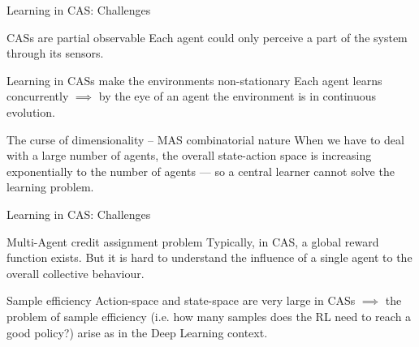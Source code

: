 \documentclass[presentation]{beamer}\mode<presentation>{\usetheme{AMSBolognaFC}}
\begin{document}
\begin{frame}[c]{Learning in CAS: Challenges}
	\begin{exampleblock}{CASs are partial observable}
		Each agent could only perceive a part of the system through its sensors.
	\end{exampleblock}
	\begin{alertblock}{Learning in CASs make the environments non-stationary}
		Each agent learns concurrently $\implies$ by the eye of an agent the environment is in continuous evolution.
	\end{alertblock}
	\begin{alertblock}{The curse of dimensionality -- MAS combinatorial nature}
		When we have to deal with a large number of agents, the overall state-action space is increasing exponentially to the number of agents --- so a central learner cannot solve the learning problem.
	\end{alertblock}
\end{frame}
\begin{frame}[c]{Learning in CAS: Challenges}
	\begin{exampleblock}{Multi-Agent credit assignment problem}
		Typically, in CAS, a global reward function exists. But it is hard to understand the influence of a single agent to
		the overall collective behaviour.
	\end{exampleblock}
	\begin{exampleblock}{Sample efficiency}
		Action-space and state-space are very large in CASs $\implies$ the problem of sample efficiency (i.e. how many samples does the RL need to reach a good policy?)
		arise as in the Deep Learning context. 
	\end{exampleblock}
\end{frame}
\end{document}
